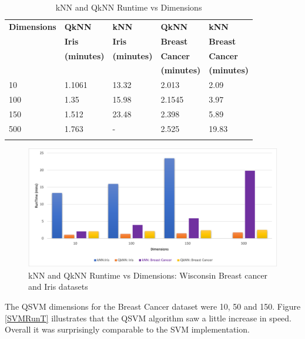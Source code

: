 \begin{table}
\caption{kNN and QkNN Runtime vs Dimensions}
\label{tab:treatments}
\centering
\begin{tabular}{l l l l  l}
\toprule
\textbf{Dimensions} & \textbf{QkNN}& \textbf{kNN} & \textbf{QkNN} &  \textbf{kNN} \\
\textbf{} & \textbf{Iris} & \textbf{Iris} &  
\textbf{Breast} & \textbf{Breast}\\
\textbf{} & \textbf{(minutes)} &  \textbf{(minutes)} & \textbf{Cancer}& \textbf{Cancer}\\
\textbf{} & \textbf{} &  \textbf{} &  \textbf{(minutes)}& \textbf{(minutes)}\\
\midrule
10 & 1.1061 & 13.32 & 2.013 &  2.09 \\
100 & 1.35 & 15.98 & 2.1545 & 3.97\\
150 & 1.512 & 23.48 & 2.398 & 5.89\\
500 & 1.763 & - & 2.525 & 19.83\\
\bottomrule\\
\end{tabular}
\normalsize
\end{table}
\begin{figure}[H]
      \centering
      \includegraphics[scale=0.7]{background/KnnRun2.png}
      \caption{kNN and QkNN Runtime vs Dimensions: Wisconsin Breast cancer and Iris datasets}
      \label{kNNRunT}
\end{figure}

The QSVM dimensions for the Breast Cancer dataset were 10, 50 and 150. Figure \ref{SVMRunT} illustrates that 
the QSVM algorithm saw a little increase in speed. Overall it was surprisingly comparable to the SVM implementation. 


